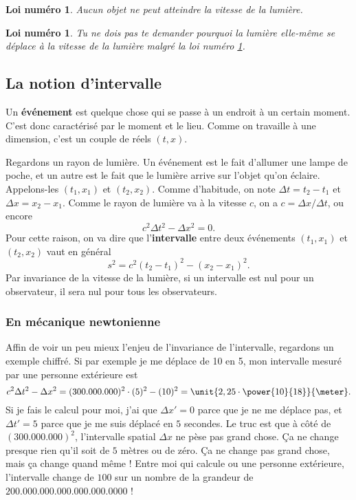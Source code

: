 \documentclass[a4paper,12pt]{book}
\newcounter{numloiphyz}
\theoremstyle{mes_exemples}	\newtheorem{exemple}[numtho]{Exemple}
\theoremstyle{mes_tho}
\newtheorem{loiphyz}[numloiphyz]{Loi numéro}
\newcommand{\defe}[2]{\textbf{#1}\index{#2}}
\begin{document}
\begin{loiphyz}\label{loivitlumlimite}
Aucun objet ne peut atteindre la vitesse de la lumière.
\end{loiphyz}

\begin{loiphyz}
Tu ne dois pas te demander pourquoi la lumière elle-même se déplace à la vitesse de la lumière malgré la loi numéro \ref{loivitlumlimite}.
\end{loiphyz}

\subsection{La notion d'intervalle}


Un \defe{événement}{Événement} est quelque chose qui se passe à un endroit à un certain moment. C'est donc caractérisé par le moment et le lieu. Comme on travaille à une dimension, c'est un couple de réels $(t,x)$. 

Regardons un rayon de lumière. Un événement est le fait d'allumer une lampe de poche, et un autre est le fait que le lumière arrive sur l'objet qu'on éclaire. Appelons-les $(t_1,x_1)$ et $(t_2,x_2)$. Comme d'habitude, on note $\Delta t=t_2-t_1$ et $\Delta x=x_2-x_1$. Comme le rayon de lumière va à la vitesse $c$, on a $c=\Delta x/\Delta t$, ou encore
\[ 
  c^2\Delta t^2-\Delta x^2=0.
\]
Pour cette raison, on va dire que l'\defe{intervalle}{Intervalle} entre deux événements $(t_1,x_1)$ et $(t_2,x_2)$ vaut en général
\begin{equation}
 s^2=c^2(t_2-t_1)^2-(x_2-x_1)^2.
\end{equation}
Par invariance de la vitesse de la lumière, si un intervalle est nul pour un observateur, il sera nul pour tous les observateurs.


\subsubsection{En mécanique newtonienne}

Affin de voir un peu mieux l'enjeu de l'invariance de l'intervalle, regardons un exemple chiffré.  Si par exemple je me déplace de \unit{10}{\meter} en \unit{5}{\second}, mon intervalle mesuré par une personne extérieure est
\[ 
  c^2\Delta t^2-\Delta x^2=(300.000.000)^2\cdot (5)^2 - (10)^2=\unit{2,25\cdot \power{10}{18}}{\meter}.
\]
Si je fais le calcul pour moi, j'ai que $\Delta x'=0$ parce que je ne me déplace pas, et $\Delta t'=5$ parce que je me suis déplacé en $5$ secondes. Le truc est que à côté de $(300.000.000)^2$, l'intervalle spatial $\Delta x$ ne pèse pas grand chose. Ça ne change presque rien qu'il soit de $5$ mètres ou de zéro. Ça ne change pas grand chose, mais ça change quand même ! Entre moi qui calcule ou une personne extérieure, l'intervalle change de $100$ sur un nombre de la grandeur de $200.000.000.000.000.000.0000$ !
\end{document}
